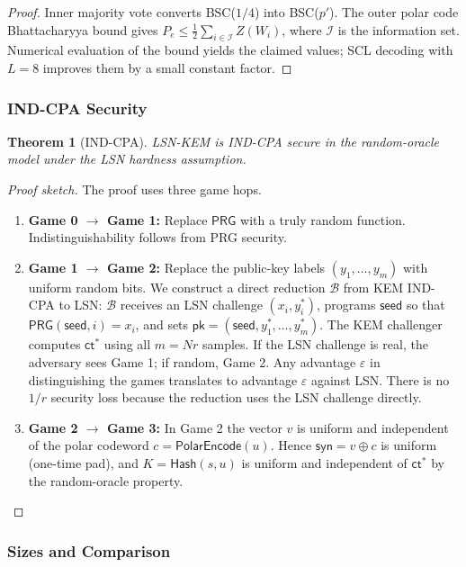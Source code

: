 \documentclass[11pt,a4paper]{article}
\theoremstyle{plain}
\newtheorem{theorem}{Theorem}[section]
\theoremstyle{definition}
\begin{document}
\begin{proof}
Inner majority vote converts BSC($1/4$) into BSC($p'$). The outer polar code Bhattacharyya bound gives $P_e \leq \frac{1}{2}\sum_{i \in \mathcal{I}} Z(W_i)$, where $\mathcal{I}$ is the information set. Numerical evaluation of the bound yields the claimed values; SCL decoding with $L=8$ improves them by a small constant factor.
\end{proof}

\subsubsection{IND-CPA Security}
\label{subsubsec:kem-indcpa}

\begin{theorem}[IND-CPA]
LSN-KEM is IND-CPA secure in the random-oracle model under the LSN hardness assumption.
\end{theorem}

\begin{proof}[Proof sketch]
The proof uses three game hops.
\begin{enumerate}
\item \textbf{Game 0 $\to$ Game 1:} Replace $\mathsf{PRG}$ with a truly random function. Indistinguishability follows from PRG security.
\item \textbf{Game 1 $\to$ Game 2:} Replace the public-key labels $(y_1,\dots,y_m)$ with uniform random bits. We construct a direct reduction $\mathcal{B}$ from KEM IND-CPA to LSN: $\mathcal{B}$ receives an LSN challenge $(x_i, y_i^*)$, programs $\mathsf{seed}$ so that $\mathsf{PRG}(\mathsf{seed},i)=x_i$, and sets $\mathsf{pk}=(\mathsf{seed}, y_1^*,\dots,y_m^*)$. The KEM challenger computes $\mathsf{ct}^*$ using all $m=Nr$ samples. If the LSN challenge is real, the adversary sees Game 1; if random, Game 2. Any advantage $\varepsilon$ in distinguishing the games translates to advantage $\varepsilon$ against LSN. There is no $1/r$ security loss because the reduction uses the LSN challenge directly.
\item \textbf{Game 2 $\to$ Game 3:} In Game 2 the vector $v$ is uniform and independent of the polar codeword $c=\mathsf{PolarEncode}(u)$. Hence $\mathsf{syn}=v \oplus c$ is uniform (one-time pad), and $K=\mathsf{Hash}(s,u)$ is uniform and independent of $\mathsf{ct}^*$ by the random-oracle property.
\qedhere
\end{enumerate}
\end{proof}

\subsubsection{Sizes and Comparison}
\label{subsubsec:kem-sizes}
\end{document}
